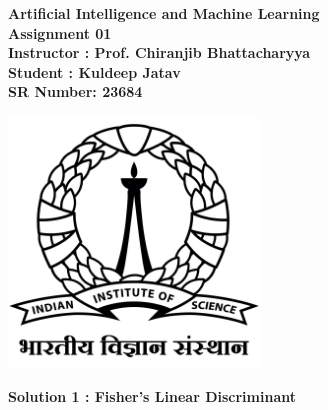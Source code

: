 \documentclass{article}
\begin{document}
    \thispagestyle{empty}
    \begin{center}
        \huge{\textbf{Artificial Intelligence and Machine Learning}} \\ 
        \vspace{1cm}
        \huge{\textbf{Assignment 01}} \\ 
        \vspace{2cm}
        \huge{\textbf{Instructor : Prof. Chiranjib Bhattacharyya}} \\
        \vspace{0.5cm}
        \huge{\textbf{Student : Kuldeep Jatav}} \\
        \vspace{0.5cm}
        \huge{\textbf{SR Number: 23684}} \\ 
        \vspace{3cm}

        \includegraphics[width=0.5\textwidth]{IIScLogo.jpg}
    \end{center}
    
    \newpage
\noindent    \textbf{Solution 1 : Fisher's Linear Discriminant}
\end{document}
